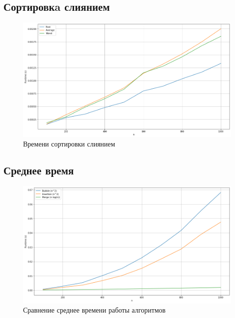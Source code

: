 \subsection{Сортировкa слиянием}
\begin{figure}[h!]
    \centering
    \includegraphics[width=1\textwidth]{3/inc/p3.png}
    \caption{Времени сортировки слиянием}
\end{figure}

\subsection{Среднее время}
\begin{figure}[h!]
    \centering
    \includegraphics[width=1\textwidth]{3/inc/p4.png}
    \caption{Сравнение среднее времени работы алгоритмов}
\end{figure}

